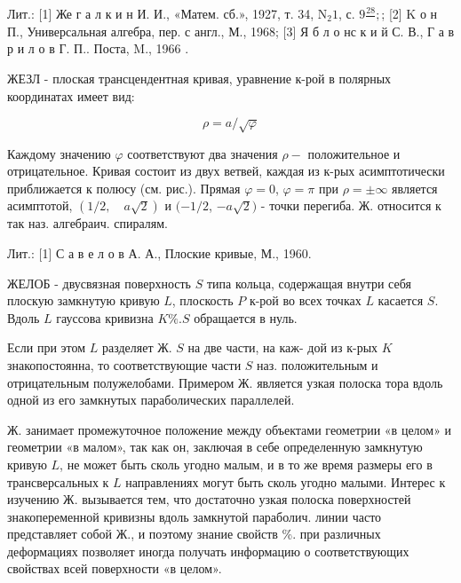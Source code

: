 \documentclass[10pt]{article}
\begin{document}
Лит.: [1] Же г а л к и н И. И., «Матем. сб.», 1927, т. 34, $\mathrm{N}_{2} 1$, с. $9 \frac{28}{} ;$; [2] K о н П., Универсальная алгебра, пер. с англ., М., 1968; [3] Я б л о нс к и й С. В., Г а в р и л о в Г. П.. Поста, M., 1966 .



ЖЕЗЛ - плоская трансцендентная кривая, уравнение к-рой в полярных координатах имеет вид:



\[

\rho=a / \sqrt{\varphi}

\]



Каждому значению $\varphi$ соответствуют два значения $\rho-$ положительное и отрицательное. Кривая состоит из двух ветвей, каждая из к-рых асимптотически приближается к полюсу (см. рис.). Прямая $\varphi=0$, $\varphi=\pi$ при $\rho= \pm \infty$ является асимптотой, $(1 / 2, \quad a \sqrt{2})$ и $(-1 / 2$, $-a \sqrt{2})$ - точки перегиба. Ж. относится к так наз. алгебраич. спиралям.



Лит.: [1] С а в е л о в А. А., Плоские кривые, М., 1960.



ЖЕЛОБ - двусвязная поверхность $S$ типа кольца, содержащая внутри себя плоскую замкнутую кривую $L$, плоскость $P$ к-рой во всех точках $L$ касается $S$. Вдоль $L$ гауссова кривизна $K \% . S$ обращается в нуль.



Если при этом $L$ разделяет Ж. $S$ на две части, на каж- дой из к-рых $K$ знакопостоянна, то соответствующие части $S$ наз. положительным и отрицательным полужелобами. Примером Ж. является узкая полоска тора вдоль одной из его замкнутых параболических параллелей.



Ж. занимает промежуточное положение между объектами геометрии «в целом» и геометрии «в малом», так как он, заключая в себе определенную замкнутую кривую $L$, не может быть сколь угодно малым, и в то же время размеры его в трансверсальных к $L$ направлениях могут быть сколь угодно малыми. Интерес к изучению Ж. вызывается тем, что достаточно узкая полоска поверхностей знакопеременной кривизны вдоль замкнутой параболич. линии часто представляет собой Ж., и поэтому знание свойств \%. при различных деформациях позволяет иногда получать информацию о соответствующих свойствах всей поверхности «в целом».
\end{document}
